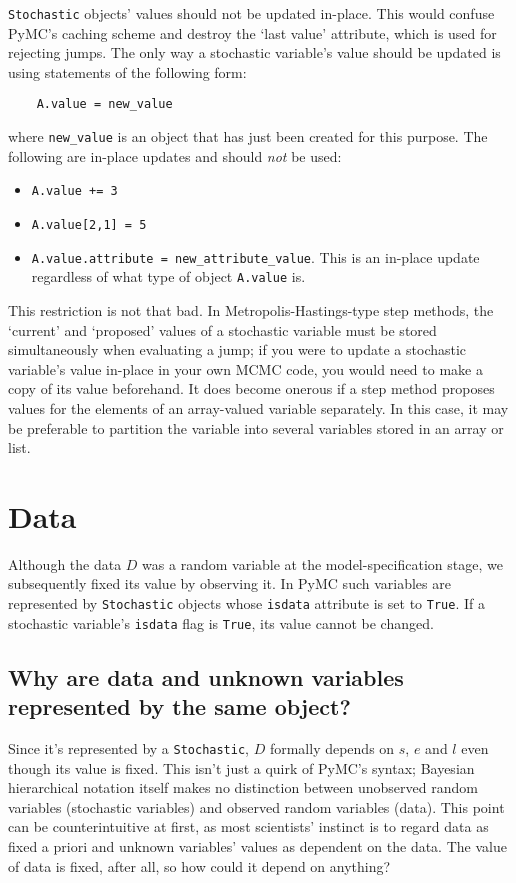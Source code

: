 \texttt{Stochastic} objects' values should not be updated in-place. This would confuse PyMC's caching scheme and destroy the `last value' attribute, which is used for rejecting jumps. The only way a stochastic variable's value should be updated is using statements of the following form:
\begin{verbatim}
    A.value = new_value
\end{verbatim}
where \texttt{new\_value} is an object that has just been created for this purpose. The following are in-place updates and should \emph{not} be used:
\begin{itemize}
    \item \texttt{A.value += 3}
    \item \texttt{A.value[2,1] = 5}
    \item \texttt{A.value.attribute = new_attribute_value}. This is an in-place update regardless of what type of object \texttt{A.value} is.
\end{itemize}

This restriction is not that bad. In Metropolis-Hastings-type step methods, the `current' and `proposed' values of a stochastic variable must be stored simultaneously when evaluating a jump; if you were to update a stochastic variable's value in-place in your own MCMC code, you would need to make a copy of its value beforehand. It does become onerous if a step method proposes values for the elements of an array-valued variable separately. In this case, it may be preferable to partition the variable into several variables stored in an array or list.

\section{Data}

Although the data $D$ was a random variable at the model-specification stage, we subsequently fixed its value by observing it. In PyMC such variables are represented by \texttt{Stochastic} objects whose \texttt{isdata} attribute is set to \texttt{True}. If a stochastic variable's \texttt{isdata} flag is \texttt{True}, its value cannot be changed.

\subsection{Why are data and unknown variables represented by the same object?}
Since it's represented by a \texttt{Stochastic}, $D$ formally depends on $s$, $e$ and $l$ even though its value is fixed. This isn't just a quirk of PyMC's syntax; Bayesian hierarchical notation itself makes no distinction between unobserved random variables (stochastic variables) and observed random variables (data). This point can be counterintuitive at first, as most scientists' instinct is to regard data as fixed a priori and unknown variables' values as dependent on the data. The value of data is fixed, after all, so how could it depend on anything?

